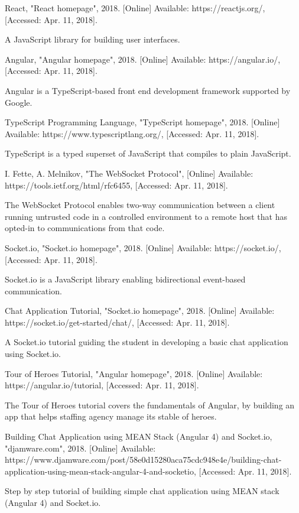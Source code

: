 \documentclass[11pt,a4paper]{report}
\begin{document}
\begin{thebibliography}{1}
 React, "React homepage", 2018. [Online] Available: https://reactjs.org/, [Accessed: Apr. 11, 2018].

  A JavaScript library for building user interfaces.

 Angular, "Angular homepage", 2018. [Online] Available: https://angular.io/, [Accessed: Apr. 11, 2018].

  Angular is a TypeScript-based front end development framework supported by Google.

 TypeScript Programming Language, "TypeScript homepage", 2018. [Online] Available: https://www.typescriptlang.org/, [Accessed: Apr. 11, 2018].

  TypeScript is a typed superset of JavaScript that compiles to plain JavaScript.

 I. Fette, A. Melnikov, "The WebSocket Protocol", [Online] Available: https://tools.ietf.org/html/rfc6455, [Accessed: Apr. 11, 2018].

  The WebSocket Protocol enables two-way communication between a client running untrusted code in a controlled environment to a remote host
  that has opted-in to communications from that code.

 Socket.io, "Socket.io homepage", 2018. [Online] Available: https://socket.io/, [Accessed: Apr. 11, 2018].

  Socket.io is a JavaScript library enabling bidirectional event-based communication.

 Chat Application Tutorial, "Socket.io homepage", 2018. [Online] Available: https://socket.io/get-started/chat/, [Accessed: Apr. 11, 2018].

  A Socket.io tutorial guiding the student in developing a basic chat application using Socket.io.

 Tour of Heroes Tutorial, "Angular homepage", 2018. [Online] Available: https://angular.io/tutorial, [Accessed: Apr. 11, 2018].

  The Tour of Heroes tutorial covers the fundamentals of Angular, by building an app that helps staffing agency manage its stable of heroes.

 Building Chat Application using MEAN Stack (Angular 4) and Socket.io, "djamware.com", 2018.
  [Online] Available: https://www.djamware.com/post/58e0d15280aca75cdc948e4e/building-chat-application-using-mean-stack-angular-4-and-socketio,
  [Accessed: Apr. 11, 2018].

  Step by step tutorial of building simple chat application using MEAN stack (Angular 4) and Socket.io.


\end{thebibliography}
\end{document}
